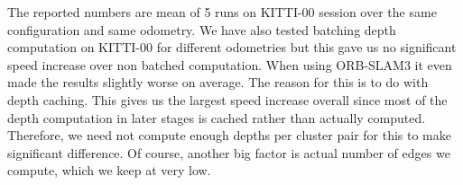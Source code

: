 The reported numbers are mean of 5 runs on KITTI-00 session over the same configuration and same odometry. We have also tested batching depth computation on KITTI-00 for different odometries but this gave us no significant speed increase over non batched computation. When using ORB-SLAM3 it even made the results slightly worse on average. The reason for this is to do with depth caching. This gives us the largest speed increase overall since most of the depth computation in later stages is cached rather than actually computed. Therefore, we need not compute enough depths per cluster pair for this to make significant difference. Of course, another big factor is actual number of edges we compute, which we keep at very low. 